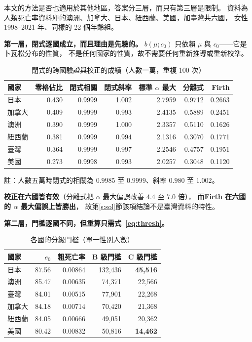 \documentclass[UTF8, fontset=macnew, a4paper, 12pt]{ctexart}
\begin{document}
本文的方法是否也適用於其他地區，答案分三層，而只有第三層是限制。
資料為人類死亡率資料庫的澳洲、加拿大、日本、紐西蘭、美國，加臺灣共六國，
女性 1998--2021 年、同樣的 22 個年齡組。

\textbf{第一層，閉式逐國成立，而且理由是先驗的。}
$b(\mu;c_0)$ 只依賴 $\mu$ 與 $c_0$——它是卜瓦松分布的性質，
不是任何國家的性質，故不需要任何重新推導或重新校準。

\begin{table}[H]
\centering
\caption{閉式的跨國驗證與校正的成績（人數一萬，重複 100 次）}
\small
\begin{tabular}{lrrrrrr}
\toprule
國家 & 零格佔比 & 閉式相關 & 閉式斜率 & 標準 $\alpha$ 最大 & 分離式 & Firth\\
\midrule
日本 & 0.430 & 0.9999 & 1.002 & 2.7959 & 0.9712 & 0.2663\\
加拿大 & 0.409 & 0.9999 & 0.993 & 2.4135 & 0.5889 & 0.2451\\
澳洲 & 0.390 & 0.9999 & 1.000 & 2.3357 & 0.5110 & 0.1626\\
紐西蘭 & 0.381 & 0.9999 & 0.994 & 2.1316 & 0.3070 & 0.1771\\
臺灣 & 0.364 & 0.9999 & 0.997 & 2.2546 & 0.4757 & 0.1951\\
美國 & 0.273 & 0.9998 & 0.993 & 2.0257 & 0.3048 & 0.1120\\
\bottomrule
\end{tabular}

\vspace{2pt}
\parbox{0.92\textwidth}{\footnotesize 註：人數五萬時閉式的相關為
$0.9985$ 至 $0.9999$、斜率 $0.980$ 至 $1.002$。}
\label{t:cross}
\end{table}

\textbf{校正在六國皆有效}（分離式把 $\alpha$ 最大偏誤改善 $4.4$ 至 $7.0$ 倍），
而\textbf{Firth 在六國的 $\alpha$ 最大偏誤上皆勝出}，
故第\ref{s:sol}節該項結論不是臺灣資料的特性。

\textbf{第二層，門檻逐國不同，但重算只需式~\eqref{eq:thresh}。}

\begin{table}[H]
\centering
\caption{各國的分級門檻（單一性別人數）}
\small
\begin{tabular}{lrrrr}
\toprule
國家 & $e_0$ & 粗死亡率 & B 級門檻 & C 級門檻\\
\midrule
日本 & 87.56 & 0.00864 & 132{,}436 & \textbf{45{,}516}\\
澳洲 & 85.47 & 0.00635 & 74{,}371 & 22{,}566\\
臺灣 & 84.01 & 0.00515 & 77{,}901 & 22{,}268\\
加拿大 & 84.18 & 0.00714 & 70{,}420 & 21{,}368\\
紐西蘭 & 84.05 & 0.00666 & 49{,}051 & 20{,}362\\
美國 & 80.42 & 0.00832 & 50{,}816 & \textbf{14{,}462}\\
\bottomrule
\end{tabular}
\label{t:thresh}
\end{table}
\end{document}
